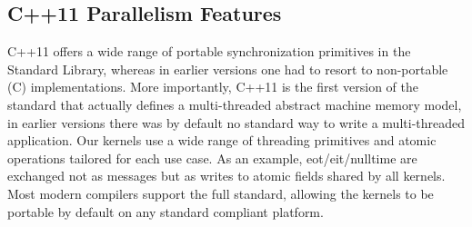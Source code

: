 \subsection{C++11 Parallelism Features}
C++11 offers a wide range of portable synchronization primitives in the Standard Library, whereas in earlier versions one had to resort to non-portable (C) implementations. More importantly, C++11 is the first version of the standard that actually defines a multi-threaded abstract machine memory model, in earlier versions there was by default no standard way to write a multi-threaded application.
 Our kernels use a wide range of threading primitives and atomic operations tailored for each use case. As an example, eot/eit/nulltime are exchanged not as messages but as writes to atomic fields shared by all kernels. Most modern compilers support the full standard, allowing the kernels to be portable by default on any standard compliant platform. %
